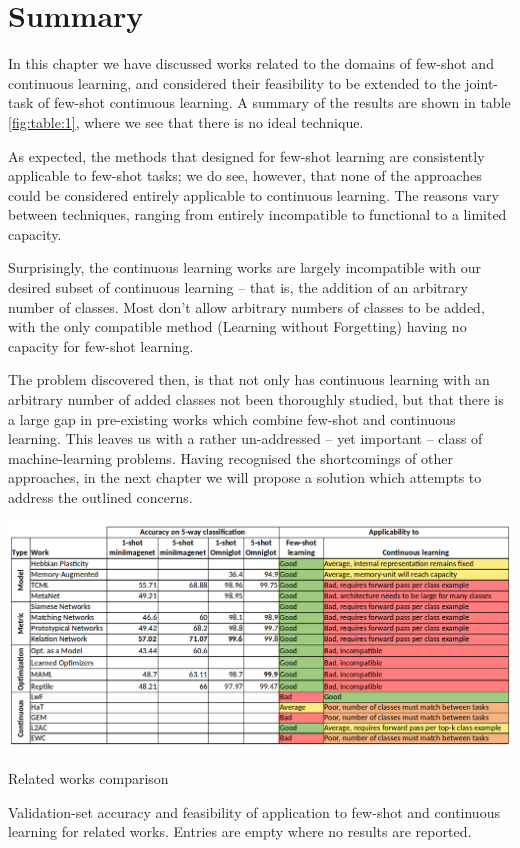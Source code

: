 \documentclass{report}
\begin{document}
\section{Summary} \label{works:summary}
In this chapter we have discussed works related to the domains of few-shot and continuous learning, and considered their feasibility to be extended to the joint-task of few-shot continuous learning. A summary of the results are shown in table \ref{fig:table:1}, where we see that there is no ideal technique. \par
As expected, the methods that designed for few-shot learning are consistently applicable to few-shot tasks; we do see, however, that none of the approaches could be considered entirely applicable to continuous learning. The reasons vary between techniques, ranging from entirely incompatible to functional to a limited capacity. \par
Surprisingly, the continuous learning works are largely incompatible with our desired subset of continuous learning -- that is, the addition of an arbitrary number of classes. Most don't allow arbitrary numbers of classes to be added, with the only compatible method (Learning without Forgetting) having no capacity for few-shot learning. \par
The problem discovered then, is that not only has continuous learning with an arbitrary number of added classes not been thoroughly studied, but that there is a large gap in pre-existing works which combine few-shot and continuous learning. This leaves us with a rather un-addressed -- yet important -- class of machine-learning problems. Having recognised the shortcomings of other approaches, in the next chapter we will propose a solution which attempts to address the outlined concerns. \par
\begin{table}[h]
 \centering
 \includegraphics[width=17cm]{table}
 \caption{Related works comparison}
 \label{fig:table:1}
 Validation-set accuracy and feasibility of application to few-shot and continuous learning for related works. Entries are empty where no results are reported.
\end{table}
\end{document}
